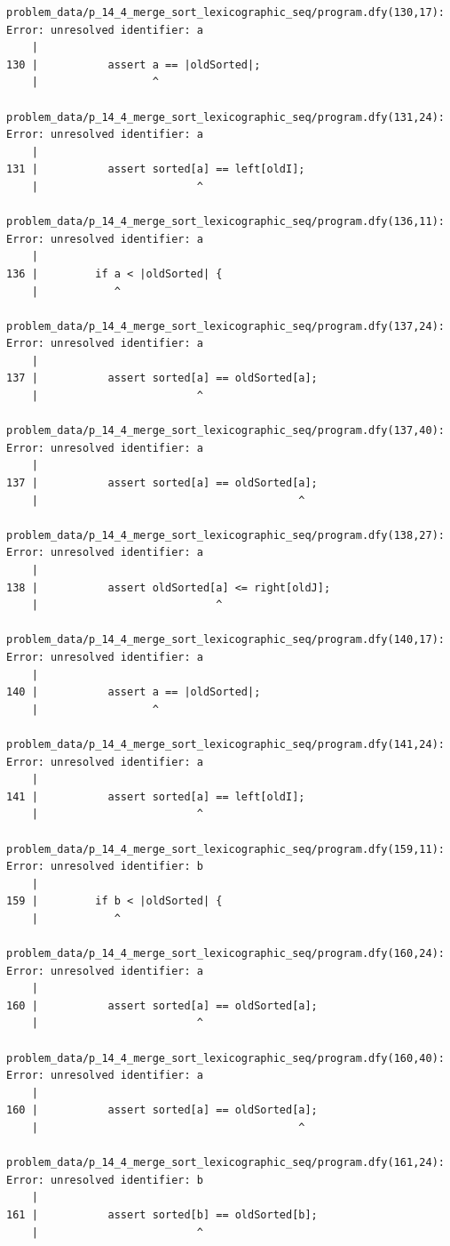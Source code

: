 \documentclass{article}
\begin{document}
\begin{lstlisting}
problem_data/p_14_4_merge_sort_lexicographic_seq/program.dfy(130,17): Error: unresolved identifier: a
    |
130 |           assert a == |oldSorted|;
    |                  ^

problem_data/p_14_4_merge_sort_lexicographic_seq/program.dfy(131,24): Error: unresolved identifier: a
    |
131 |           assert sorted[a] == left[oldI];
    |                         ^

problem_data/p_14_4_merge_sort_lexicographic_seq/program.dfy(136,11): Error: unresolved identifier: a
    |
136 |         if a < |oldSorted| {
    |            ^

problem_data/p_14_4_merge_sort_lexicographic_seq/program.dfy(137,24): Error: unresolved identifier: a
    |
137 |           assert sorted[a] == oldSorted[a];
    |                         ^

problem_data/p_14_4_merge_sort_lexicographic_seq/program.dfy(137,40): Error: unresolved identifier: a
    |
137 |           assert sorted[a] == oldSorted[a];
    |                                         ^

problem_data/p_14_4_merge_sort_lexicographic_seq/program.dfy(138,27): Error: unresolved identifier: a
    |
138 |           assert oldSorted[a] <= right[oldJ];
    |                            ^

problem_data/p_14_4_merge_sort_lexicographic_seq/program.dfy(140,17): Error: unresolved identifier: a
    |
140 |           assert a == |oldSorted|;
    |                  ^

problem_data/p_14_4_merge_sort_lexicographic_seq/program.dfy(141,24): Error: unresolved identifier: a
    |
141 |           assert sorted[a] == left[oldI];
    |                         ^

problem_data/p_14_4_merge_sort_lexicographic_seq/program.dfy(159,11): Error: unresolved identifier: b
    |
159 |         if b < |oldSorted| {
    |            ^

problem_data/p_14_4_merge_sort_lexicographic_seq/program.dfy(160,24): Error: unresolved identifier: a
    |
160 |           assert sorted[a] == oldSorted[a];
    |                         ^

problem_data/p_14_4_merge_sort_lexicographic_seq/program.dfy(160,40): Error: unresolved identifier: a
    |
160 |           assert sorted[a] == oldSorted[a];
    |                                         ^

problem_data/p_14_4_merge_sort_lexicographic_seq/program.dfy(161,24): Error: unresolved identifier: b
    |
161 |           assert sorted[b] == oldSorted[b];
    |                         ^


\end{lstlisting}
\end{document}
